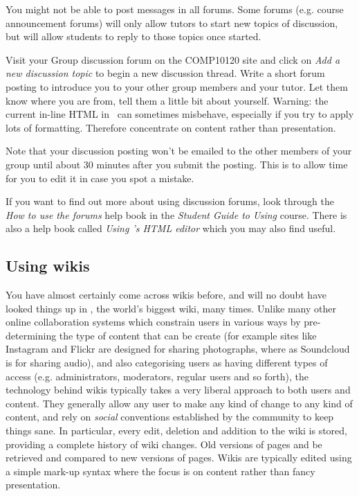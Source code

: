 You might not be able to post messages in all forums. Some forums (e.g. course announcement forums) will only allow tutors to start new topics of discussion, but will allow students to reply to those topics once started.

Visit your Group discussion forum on the COMP10120 site and click on \emph{Add a new discussion topic}  to begin a new discussion thread. Write a short forum posting to introduce you to your other group members and your tutor. Let them know where you are from, tell them a little bit about yourself. Warning: the current in-line HTML in \moodle\ can sometimes misbehave, especially if you try to apply lots of formatting. Therefore concentrate on content rather than presentation.

Note that your discussion posting won't be emailed to the other members of your group until about 30 minutes after you submit the posting. This is to allow time for you to edit it in case you spot a mistake.

If you want to find out more about using discussion forums, look through the \emph{How to use the forums}  help book in the \emph{Student Guide to Using \Moodle} course. There is also a help book called \emph{Using \moodle's HTML editor} which you may also find useful.

\subsection{Using wikis}
\label{sec:using-wikis}


You have almost certainly come across wikis before, and will no doubt have looked things up in , the world's biggest wiki, many times. Unlike many other online collaboration systems which constrain users in various ways by pre-determining the type of content that can be create (for example sites like Instagram and Flickr are designed for sharing photographs, where as Soundcloud is for sharing audio), and also categorising users as having different types of access (e.g. administrators, moderators, regular users and so forth), the technology behind wikis typically takes a very liberal approach to both users and content. They generally allow any user to make any kind of change to any kind of content, and rely on \textit{social} conventions established by the community to keep things sane. In particular, every edit, deletion and addition to the wiki is stored, providing a complete history of wiki changes. Old versions of pages and be retrieved and compared to new versions of pages. Wikis are typically edited using a simple mark-up syntax where the focus is on content rather than fancy presentation.



